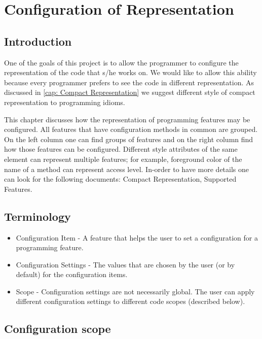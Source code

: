 \chapter{Configuration of Representation} \label{chapter:Representation Configuration}
\section{Introduction}
One of the goals of this project is to allow the programmer to configure the representation of the code that s/he works on. We would like to allow this ability because every programmer prefers to see the code in different representation. As discussed in \autoref{cap: Compact Representation} we suggest different style of compact representation to programming idioms.

This chapter discusses how the representation of programming features may be configured. All features that have configuration methods in common are grouped. On the left column one can find groups of features and on the right column find how those features can be configured. Different style attributes of the same element can represent multiple features; for example, foreground color of the name of a method can represent access level. In-order to have more details one can look for the following documents: Compact Representation, Supported Features.
\section{Terminology}
\begin{itemize}
	\item Configuration Item - A feature that helps the user to set a configuration for a programming feature.
	\item Configuration Settings - The values that are chosen by the user (or by default) for the configuration items.
	\item Scope - Configuration settings are not necessarily global. The user can apply different configuration settings to different code scopes (described below).
\end{itemize}
\section{Configuration scope}

